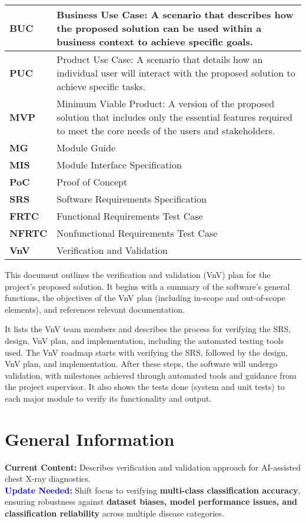 \documentclass[12pt, titlepage]{article}
\begin{document}
\begin{longtable}[c]{|p{}|p{}|}
  \textbf{BUC} & Business Use Case: A scenario that describes how the proposed solution can be used within a business context to achieve specific goals. \\ \hline
  \textbf{PUC} & Product Use Case: A scenario that details how an individual user will interact with the proposed solution to achieve specific tasks. \\ \hline
  \textbf{MVP} & Minimum Viable Product: A version of the proposed solution that includes only the essential features required to meet the core needs of the users and stakeholders. \\ \hline
  \textbf{MG} & Module Guide \\ \hline
  \textbf{MIS} & Module Interface Specification \\ \hline
  \textbf{PoC} & Proof of Concept \\ \hline
  \textbf{SRS} & Software Requirements Specification \\ \hline
  \textbf{FRTC} & Functional Requirements Test Case \\ \hline
  \textbf{NFRTC} & Nonfunctional Requirements Test Case \\ \hline
  \textbf{VnV} & Verification and Validation \\ \hline
\end{longtable}

\pagebreak
\newpage


This document outlines the verification and validation (VnV) plan for the project's proposed solution. It begins with a summary of the software's general functions, the objectives of the VnV plan (including in-scope and out-of-scope elements), and references relevant documentation.

It lists the VnV team members and describes the process for verifying the SRS, design, VnV plan, and implementation, including the automated testing tools used. The VnV roadmap starts with verifying the SRS, followed by the design, VnV plan, and implementation. After these steps, the software will undergo validation, with milestones achieved through automated tools and guidance from the project supervisor. It also shows the tests done (system and unit tests) to each major module to verify its functionality and output.

\section{General Information}
\textbf{Current Content:} Describes verification and validation approach for AI-assisted chest X-ray diagnostics. \\
\textbf{\textcolor{blue}{Update Needed:}} Shift focus to verifying \textbf{multi-class classification accuracy}, ensuring robustness against \textbf{dataset biases, model performance issues, and classification reliability} across multiple disease categories.
\end{document}
